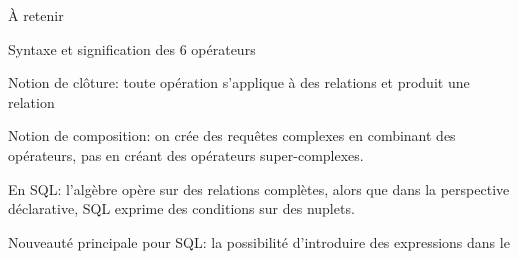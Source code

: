 \begin{frame}{À retenir}


\vfill

\begin{redbullet}
   \item Syntaxe et signification des 6 opérateurs 
  \item  Notion de \alert{clôture}: toute opération s'applique à des relations
     et produit une relation
  \item Notion de \alert{composition}: on crée des requêtes complexes en combinant
  des opérateurs, pas en créant des opérateurs super-complexes.
  \item En SQL: l'algèbre opère sur des relations complètes, alors que dans la perspective
     déclarative, SQL exprime des conditions sur des nuplets.
\end{redbullet}

\vfill
\begin{blocgauche}
Nouveauté principale pour SQL: la possibilité d'introduire des expressions dans le 
\end{blocgauche}
\end{frame}

